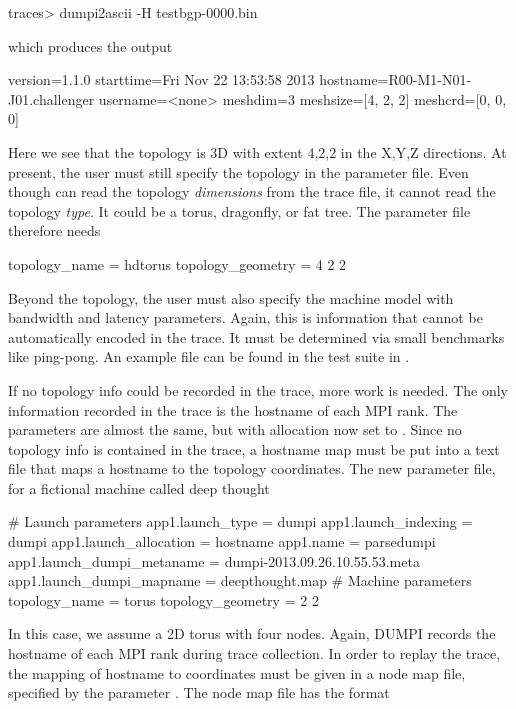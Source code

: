 \begin{ShellCmd}
traces> dumpi2ascii -H testbgp-0000.bin 
\end{ShellCmd}
which produces the output

\begin{ViFile}
version=1.1.0
starttime=Fri Nov 22 13:53:58 2013
hostname=R00-M1-N01-J01.challenger
username=<none>
meshdim=3
meshsize=[4, 2, 2]
meshcrd=[0, 0, 0]
\end{ViFile}
Here we see that the topology is 3D with extent 4,2,2 in the X,Y,Z directions.
At present, the user must still specify the topology in the parameter file.
Even though \sstmacro can read the topology \emph{dimensions} from the trace file,
it cannot read the topology \emph{type}.  It could be a torus, dragonfly, or fat tree.
The parameter file therefore needs

\begin{ViFile}
topology_name = hdtorus
topology_geometry = 4 2 2
\end{ViFile}
Beyond the topology, the user must also specify the machine model with bandwidth and latency parameters.
Again, this is information that cannot be automatically encoded in the trace.
It must be determined via small benchmarks like ping-pong.
An example file can be found in the test suite in .

If no topology info could be recorded in the trace, more work is needed.
The only information recorded in the trace is the hostname of each MPI rank.
The parameters are almost the same, but with allocation now set to .
Since no topology info is contained in the trace, 
a hostname map must be put into a text file that maps a hostname to the topology coordinates.
The new parameter file, for a fictional machine called deep thought

\begin{ViFile}
# Launch parameters
app1.launch_type = dumpi
app1.launch_indexing = dumpi
app1.launch_allocation = hostname
app1.name = parsedumpi
app1.launch_dumpi_metaname = dumpi-2013.09.26.10.55.53.meta
app1.launch_dumpi_mapname = deepthought.map
# Machine parameters
topology_name = torus
topology_geometry = 2 2
\end{ViFile}


In this case, we assume a 2D torus with four nodes.
Again, DUMPI records the hostname of each MPI rank during trace collection.
In order to replay the trace, the mapping of hostname to coordinates must be given in a node map file,
specified by the parameter .
The node map file has the format

